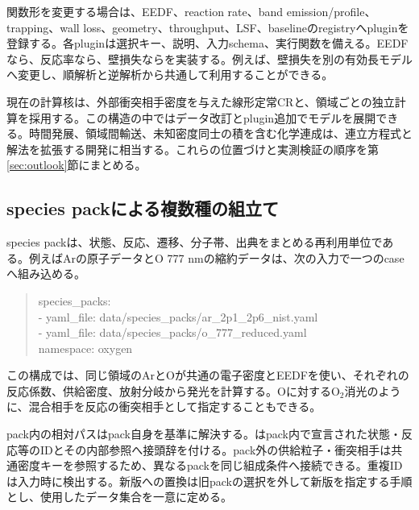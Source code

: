 関数形を変更する場合は、EEDF、reaction rate、band emission/profile、trapping、wall loss、geometry、throughput、LSF、baselineのregistryへpluginを登録する。各pluginは選択キー、説明、入力schema、実行関数を備える。EEDFなら、反応率なら、壁損失ならを実装する。例えば、壁損失を別の有効長モデルへ変更し、順解析と逆解析から共通して利用することができる。

現在の計算核は、外部衝突相手密度を与えた線形定常CRと、領域ごとの独立計算を採用する。この構造の中ではデータ改訂とplugin追加でモデルを展開できる。時間発展、領域間輸送、未知密度同士の積を含む化学連成は、連立方程式と解法を拡張する開発に相当する。これらの位置づけと実測検証の順序を第\ref{sec:outlook}節にまとめる。

\subsection{species packによる複数種の組立て}
species packは、状態、反応、遷移、分子帯、出典をまとめる再利用単位である。例えばArの原子データとO 777 nmの縮約データは、次の入力で一つのcaseへ組み込める。
\begin{quote}\small\ttfamily
species\_packs:\\
\hspace*{1em}- yaml\_file: data/species\_packs/ar\_2p1\_2p6\_nist.yaml\\
\hspace*{1em}- yaml\_file: data/species\_packs/o\_777\_reduced.yaml\\
\hspace*{2em}namespace: oxygen
\end{quote}
この構成では、同じ領域のArとOが共通の電子密度とEEDFを使い、それぞれの反応係数、供給密度、放射分岐から発光を計算する。Oに対するO$_2$消光のように、混合相手を反応の衝突相手として指定することもできる。

pack内の相対パスはpack自身を基準に解決する。はpack内で宣言された状態・反応等のIDとその内部参照へ接頭辞を付ける。pack外の供給粒子・衝突相手は共通密度キーを参照するため、異なるpackを同じ組成条件へ接続できる。重複IDは入力時に検出する。新版への置換は旧packの選択を外して新版を指定する手順とし、使用したデータ集合を一意に定める。

